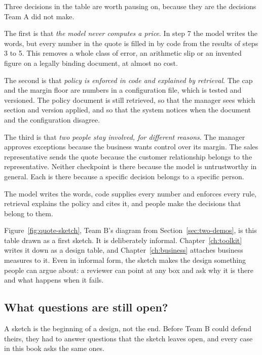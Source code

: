 Three decisions in the table are worth pausing on, because they are the decisions Team A did not make.

The first is that \emph{the model never computes a price}. In step 7 the model writes the words, but every number in the quote is filled in by code from the results of steps 3 to 5. This removes a whole class of error, an arithmetic slip or an invented figure on a legally binding document, at almost no cost.

The second is that \emph{policy is enforced in code and explained by retrieval}. The cap and the margin floor are numbers in a configuration file, which is tested and versioned. The policy document is still retrieved, so that the manager sees which section and version applied, and so that the system notices when the document and the configuration disagree.

The third is that \emph{two people stay involved, for different reasons}. The manager approves exceptions because the business wants control over its margin. The sales representative sends the quote because the customer relationship belongs to the representative. Neither checkpoint is there because the model is untrustworthy in general. Each is there because a specific decision belongs to a specific person.

\begin{keyidea}
The model writes the words, code supplies every number and enforces every rule, retrieval explains the policy and cites it, and people make the decisions that belong to them.
\end{keyidea}

Figure~\ref{fig:quote-sketch}, Team B's diagram from Section~\ref{sec:two-demos}, is this table drawn as a first sketch. It is deliberately informal. Chapter~\ref{ch:toolkit} writes it down as a design table, and Chapter~\ref{ch:business} attaches business measures to it. Even in informal form, the sketch makes the design something people can argue about: a reviewer can point at any box and ask why it is there and what happens when it fails.

\subsection{What questions are still open?}

A sketch is the beginning of a design, not the end. Before Team B could defend theirs, they had to answer questions that the sketch leaves open, and every case in this book asks the same ones.

